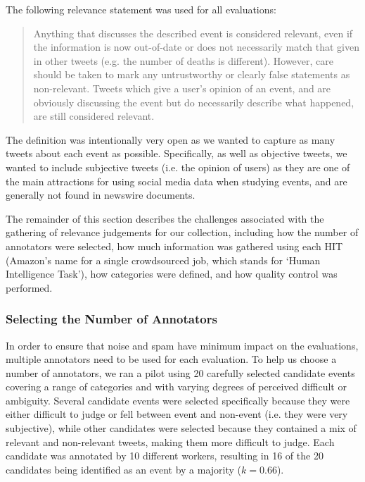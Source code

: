 
The following relevance statement was used for all evaluations:

\begin{quote}
Anything that discusses the described event is considered relevant, even if the information is now out-of-date or does not necessarily match that given in other tweets (e.g. the number of deaths is different).
However, care should be taken to mark any untrustworthy or clearly false statements as non-relevant.
Tweets which give a user's opinion of an event, and are obviously discussing the event but do necessarily describe what happened, are still considered relevant.
\end{quote}

The definition was intentionally very open as we wanted to capture as many tweets about each event as possible.
Specifically, as well as objective tweets, we wanted to include subjective tweets (i.e. the opinion of users) as they are one of the main attractions for using social media data when studying events, and are generally not found in newswire documents.

The remainder of this section describes the challenges associated with the gathering of relevance judgements for our collection, including how the number of annotators were selected, how much information was gathered using each HIT (Amazon's name for a single crowdsourced job, which stands for `Human Intelligence Task'), how categories were defined, and how quality control was performed.

\subsubsection{Selecting the Number of Annotators}
\label{sec:numAnnotators}
In order to ensure that noise and spam have minimum impact on the evaluations, multiple annotators need to be used for each evaluation.
To help us choose a number of annotators, we ran a pilot using 20 carefully selected candidate events covering a range of categories and with varying degrees of perceived difficult or ambiguity.
Several candidate events were selected specifically because they were either difficult to judge or fell between event and non-event (i.e. they were very subjective), while other candidates were selected because they contained a mix of relevant and non-relevant tweets, making them more difficult to judge.
Each candidate was annotated by 10 different workers, resulting in 16 of the 20 candidates being identified as an event by a majority (\(k = 0.66\)).

